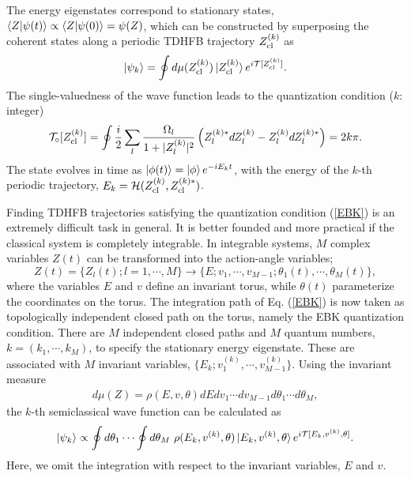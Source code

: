 \documentclass[%
superscriptaddress,
preprint,
showpacs,
nofootinbib,
amsmath,amssymb,
aps,
prc,
floatfix ]%
{revtex4-1}
\begin{document}
The energy eigenstates correspond to stationary states,
$\braket{Z|\psi(t)} \propto \braket{Z|\psi(0)}=\psi(Z)$,
which can be constructed by superposing the coherent states along
a periodic TDHFB trajectory $Z_{\rm cl}^{(k)}$ as \cite{KS80,K81,SM88}
\begin{equation}
	\ket{\psi_k} = \oint d\mu(Z_{\rm cl}^{(k)}) \ket{Z_{\rm cl}^{(k)}}
	e^{i\mathcal{T}[Z_{\rm cl}^{(k)}]} .
\end{equation}
The single-valuedness of the wave function leads to
the quantization condition ($k$: integer)
\begin{equation}
	\mathcal{T}_\circ[Z_{\rm cl}^{(k)}]=
	\oint \frac{i}{2} \sum_l \frac{\Omega_l}{1+|Z_l^{(k)}|^2}
	\left(Z_l^{(k)*} dZ_l^{(k)} - Z_l^{(k)} dZ_l^{(k)*}\right) = 2k\pi .
	\label{EBK}
\end{equation}
The state evolves in time as $\ket{\phi(t)}=\ket{\phi}e^{-iE_k t}$,
with the energy of the $k$-th periodic trajectory,
$E_k=\mathcal{H}(Z_{\rm cl}^{(k)},Z_{\rm cl}^{(k)*})$.

Finding TDHFB trajectories satisfying the quantization condition
(\ref{EBK}) is an extremely difficult task in general.
It is better founded and more practical
if the classical system is completely integrable.
In integrable systems, $M$ complex variables $Z(t)$ can be transformed into
the action-angle variables;
\begin{equation}
	Z(t) = \{Z_l(t);l=1,\cdots,M \} \rightarrow
	\{E; v_1,\cdots,v_{M-1}; \theta_1(t),\cdots,\theta_M(t)\} ,
\end{equation}
where the variables $E$ and $v$ define an invariant torus,
while $\theta(t)$ parameterize the coordinates on the torus.
The integration path of Eq. (\ref{EBK}) is now taken as topologically
independent closed path on the torus,
namely the EBK quantization condition.
There are $M$ independent closed paths and $M$ quantum numbers,
$k=(k_1,\cdots,k_M)$, to specify the stationary energy eigenstate.
These are associated with $M$ invariant variables,
$\{E_k;v_1^{(k)},\cdots,v_{M-1}^{(k)}\}$.
Using the invariant measure
\begin{align}
  d\mu(Z) = \rho(E,v,\theta) dEdv_1\cdots dv_{M-1}d\theta_1\cdots d\theta_M,
\end{align}
the $k$-th semiclassical wave function can be calculated as
\begin{equation}
  \ket{\psi_k} \propto \oint d\theta_1\cdots \oint d\theta_M \ 
	\rho(E_k,v^{(k)},\theta)
	\ket{E_k,v^{(k)},\theta} e^{i\mathcal{T}[E_k,v^{(k)},\theta]} .
  \label{semi_wave_func}
\end{equation}
Here, we omit the integration with respect to the invariant variables,
$E$ and $v$.
\end{document}
